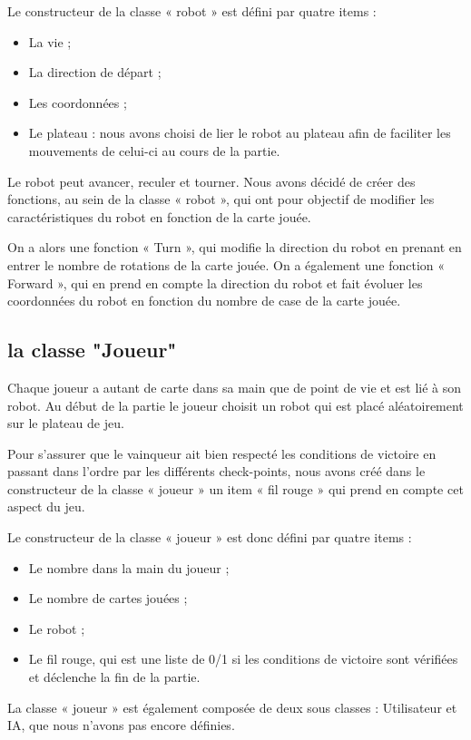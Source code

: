 \documentclass[a4paper,12pt]{report}
\begin{document}
Le constructeur de la classe « robot » est défini par quatre items :

\begin{itemize}
\item La vie ;
\item La direction de départ ;
\item Les coordonnées ;
\item Le plateau : nous avons choisi de lier le robot au plateau afin de faciliter les mouvements de celui-ci au cours de la partie.
\end{itemize}

Le robot peut avancer, reculer et tourner. Nous avons décidé de créer des fonctions, au sein de la classe « robot », qui ont pour objectif de modifier les caractéristiques du robot en fonction de la carte jouée.

On a alors une fonction « Turn », qui modifie la direction du robot en prenant en entrer le nombre de rotations de la carte jouée. On a également une fonction « Forward », qui en prend en compte la direction du robot et fait évoluer les coordonnées du robot en fonction du nombre de case de la carte jouée.  	


		\subsection{la classe "Joueur"}


Chaque joueur a autant de carte dans sa main que de point de vie et est lié à son robot. Au début de la partie le joueur choisit un robot qui est placé aléatoirement sur le plateau de jeu.

Pour s’assurer que le vainqueur ait bien respecté les conditions de victoire en passant dans l’ordre par les différents check-points, nous avons créé dans le constructeur de la classe « joueur » un item « fil rouge » qui prend en compte cet aspect du jeu.

Le constructeur de la classe « joueur » est donc défini par quatre items :
\begin{itemize}
\item Le nombre dans la main du joueur ;
\item Le nombre de cartes jouées ;
\item Le robot ;
\item Le fil rouge, qui est une liste de 0/1 si les conditions de victoire sont vérifiées et déclenche la fin de la partie.
\end{itemize}

La classe « joueur » est également composée de deux sous classes : Utilisateur et IA, que nous n’avons pas encore définies.
\end{document}

